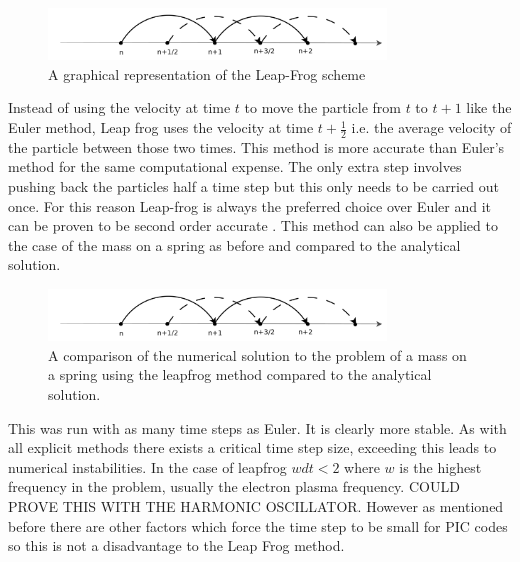 \documentclass[12pt]{article}
\begin{document}
\begin{figure}[H]
\centering
\includegraphics[width=0.8\textwidth]{Leapfrog}
\caption{A graphical representation of the Leap-Frog scheme\cite{shape}}
\label{fig:Leapfrog}
\end{figure}
Instead of using the velocity at time $t$ to move the particle from $t$ to $t+1$ like the Euler method, Leap frog uses the velocity at time $t+\frac{1}{2}$ i.e. the average velocity of the particle between those two times. This method is more accurate than Euler's method for the same computational expense. The only extra step involves pushing back the particles half a time step but this only needs to be carried out once. For this reason Leap-frog is always the preferred choice over Euler and it can be proven to be second order accurate \cite{second_order}.
This method can also be applied to the case of the mass on a spring as before and compared to the analytical solution.
\begin{figure}[H]
\centering
\includegraphics[width=0.8\textwidth]{leapfrog}
\caption{A comparison of the numerical solution to the problem of a mass on a spring using the leapfrog method compared to the analytical solution.}
\end{figure}
This was run with as many time steps as Euler. It is clearly more stable. As with all explicit methods there exists a critical time step size, exceeding this leads to numerical instabilities. In the case of leapfrog $w dt <2 $ where $w$ is the highest frequency in the problem, usually the electron plasma frequency. COULD PROVE THIS WITH THE HARMONIC OSCILLATOR. However as mentioned before there are other factors which force the time step to be small for PIC codes so this is not a disadvantage to the Leap Frog method.
\end{document}
